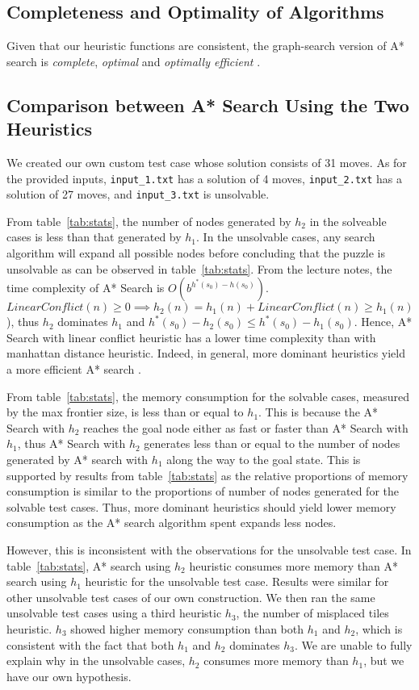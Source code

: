 \documentclass[10pt, a4paper]{article}
\theoremstyle{definition}
\begin{document}
\subsection{Completeness and Optimality of Algorithms}
Given that our heuristic functions are consistent, the graph-search version of A* search is \emph{complete}, \emph{optimal} and \emph{optimally efficient} \cite{russell_norvig_davis_2010}.

\subsection{Comparison between A* Search Using the Two Heuristics}
We created our own custom test case whose solution consists of 31 moves. As for the provided inputs, \texttt{input\_1.txt} has a solution of 4 moves, \texttt{input\_2.txt} has a solution of 27 moves, and \texttt{input\_3.txt} is unsolvable.

From table~\ref{tab:stats}, the number of nodes generated by $h_2$ in the solveable cases is less than that generated by $h_1$.
In the unsolvable cases, any search algorithm will expand all possible nodes before concluding that the puzzle is unsolvable as can be observed in table~\ref{tab:stats}.
From the lecture notes, the time complexity of A* Search is $O(b^{h^*(s_0)-h(s_0)})$. $LinearConflict(n) \geq 0 \implies h_2(n) = h_1(n) + LinearConflict(n) \geq h_1(n)$), thus $h_2$ dominates $h_1$ and $h^*(s_0)-h_2(s_0) \leq h^*(s_0)-h_1(s_0)$.
Hence, A* Search with linear conflict heuristic has a lower time complexity than with manhattan distance heuristic.
Indeed, in general, more dominant heuristics yield a more efficient A* search \cite[p.~104]{russell_norvig_davis_2010}.


From table~\ref{tab:stats}, the memory consumption for the solvable cases, measured by the max frontier size, is less than or equal to $h_1$.
This is because the A* Search with $h_2$ reaches the goal node either as fast or faster than A* Search with $h_1$, thus A* Search with $h_2$ generates less than or equal to the number of nodes generated by A* search with $h_1$ along the way to the goal state.
This is supported by results from table~\ref{tab:stats} as the relative proportions of memory consumption is similar to the proportions of number of nodes generated for the solvable test cases.
Thus, more dominant heuristics should yield lower memory consumption as the A* search algorithm spent expands less nodes.

However, this is inconsistent with the observations for the unsolvable test case.
In table~\ref{tab:stats}, A* search using $h_2$ heuristic consumes more memory than A* search using $h_1$ heuristic for the unsolvable test case.
Results were similar for other unsolvable test cases of our own construction.
We then ran the same unsolvable test cases using a third heuristic $h_3$, the number of misplaced tiles heuristic.
$h_3$ showed higher memory consumption than both $h_1$ and $h_2$, which is consistent with the fact that both $h_1$ and $h_2$ dominates $h_3$.
We are unable to fully explain why in the unsolvable cases, $h_2$ consumes more memory than $h_1$, but we have our own hypothesis.
\end{document}
